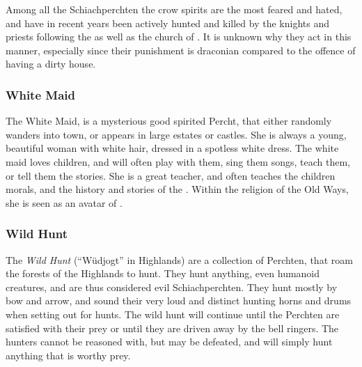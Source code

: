 Among all the Schiachperchten the crow spirits are the most feared and hated,
and have in recent years been actively hunted and killed by the knights and
priests following the  as well as the church of
. It is unknown why they act in this manner, especially since
their punishment is draconian compared to the offence of having a dirty house.

\subsubsection{White Maid}
\label{sec:White Maid}

The White Maid, is a mysterious good spirited Percht, that either randomly
wanders into town, or appears in large estates or castles. She is always a
young, beautiful woman with white hair, dressed in a spotless white dress. The
white maid loves children, and will often play with them, sing them songs,
teach them, or tell them the stories. She is a great teacher, and often
teaches the children morals, and the history and stories of the
. Within the religion of the Old Ways, she is seen as an
avatar of .

\subsubsection{Wild Hunt}
\label{sec:Wild Hunt}

The \emph{Wild Hunt} (``Wüdjogt'' in Highlands) are a collection of Perchten,
that roam the forests of the Highlands to hunt. They hunt anything, even
humanoid creatures, and are thus considered evil Schiachperchten. They hunt
mostly by bow and arrow, and sound their very loud and distinct hunting horns
and drums when setting out for hunts. The wild hunt will continue until the
Perchten are satisfied with their prey or until they are driven away by the
bell ringers. The hunters cannot be reasoned with, but may be defeated, and
will simply hunt anything that is worthy prey.

